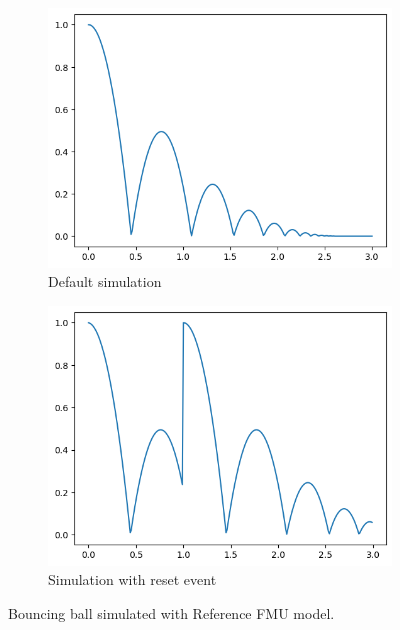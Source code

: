 \documentclass[conference]{IEEEtran}
\begin{document}
\begin{figure}[htbp]
  \centering
  \begin{subfigure}[b]{\linewidth}
    \centering
    \includegraphics[width=0.5\linewidth]{images/reference-fmu-default.png}
    \caption{Default simulation}
    \label{bb:reference-fmu-default}
  \end{subfigure}
  
  \vspace{1em}
  
  \begin{subfigure}[b]{\linewidth}
    \centering
    \includegraphics[width=0.5\linewidth]{images/reference-fmu-with-event.png}
    \caption{Simulation with reset event}
    \label{bb:reference-fmu-with-event}
  \end{subfigure}
  
  \caption{Bouncing ball simulated with Reference FMU model.}
  \label{capacitor-discharge}
\end{figure}
\end{document}
